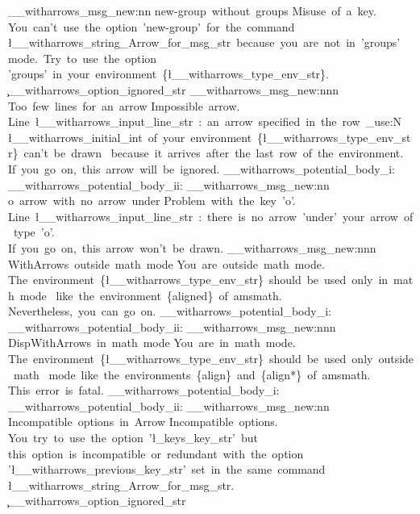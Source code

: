 \__witharrows_msg_new:nn { new-group~without~groups }
  {
    Misuse~of~a~key.\\
    You~can't~use~the~option~'new-group'~for~the~command~
    \l__witharrows_string_Arrow_for_msg_str\
    because~you~are~not~in~'groups'~mode.~Try~to~use~the~option~
    'groups'~in~your~environment~\{\l__witharrows_type_env_str\}. \\
    \c__witharrows_option_ignored_str
  }
\__witharrows_msg_new:nnn
  { Too~few~lines~for~an~arrow }
  {
    Impossible~arrow.\\
    Line~\l__witharrows_input_line_str\
    :~an~arrow~specified~in~the~row~\int_use:N \l__witharrows_initial_int\
    of~your~environment~\{\l__witharrows_type_env_str\}~can't~be~drawn~
    because~it~arrives~after~the~last~row~of~the~environment. \\
    If~you~go~on,~this~arrow~will~be~ignored.
    \__witharrows_potential_body_i:
  }
  { \__witharrows_potential_body_ii: }
\__witharrows_msg_new:nn { o~arrow~with~no~arrow~under }
  {
    Problem~with~the~key~'o'.\\
    Line~\l__witharrows_input_line_str\
    :~there~is~no~arrow~'under'~your~arrow~of~type~'o'.\\
    If~you~go~on,~this~arrow~won't~be~drawn.
  }
\__witharrows_msg_new:nnn { WithArrows~outside~math~mode }
  {
    You~are~outside~math~mode.\\
    The~environment~\{\l__witharrows_type_env_str\}~should~be~used~only~in~math~mode~
    like~the~environment~\{aligned\}~of~amsmath. \\
    Nevertheless,~you~can~go~on.
    \__witharrows_potential_body_i:
  }
  { \__witharrows_potential_body_ii: }
\__witharrows_msg_new:nnn { DispWithArrows~in~math~mode }
  {
    You~are~in~math~mode.\\
    The~environment~\{\l__witharrows_type_env_str\}~should~be~used~only~outside~math~
    mode~like~the~environments~\{align\}~and~\{align*\}~of~amsmath. \\
    This~error~is~fatal.
    \__witharrows_potential_body_i:
  }
  { \__witharrows_potential_body_ii: }
\__witharrows_msg_new:nn { Incompatible~options~in~Arrow }
  {
    Incompatible~options.\\
    You~try~to~use~the~option~'\l_keys_key_str'~but~
    this~option~is~incompatible~or~redundant~with~the~option~
    '\l__witharrows_previous_key_str'~set~in~the~same~command~
    \l__witharrows_string_Arrow_for_msg_str. \\
    \c__witharrows_option_ignored_str
  }
